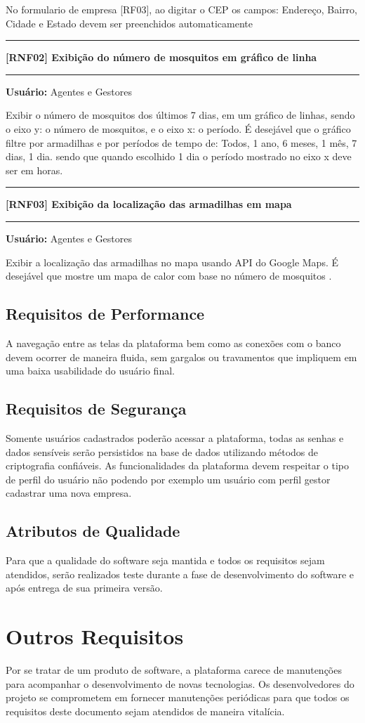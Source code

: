 	No formulario de empresa [RF03], ao digitar o CEP os campos: Endereço, Bairro, Cidade e Estado devem ser preenchidos automaticamente
	\begin{center}
		\noindent\rule{\textwidth}{0.4pt}
		\textbf{[RNF02] Exibição do número de mosquitos em gráfico de linha}
		\noindent\rule{\textwidth}{0.4pt}
	\end{center}
	\textbf{Usuário:} Agentes e Gestores
	
	Exibir o número de mosquitos dos últimos 7 dias, em um gráfico de linhas, sendo o eixo y: o número de mosquitos, e o eixo x: o período. 
	É desejável que o gráfico filtre por armadilhas e por períodos de tempo de: Todos, 1 ano, 6 meses, 1 mês, 7 dias, 1 dia. sendo que quando escolhido 
	1 dia o período mostrado no eixo x deve ser em horas.
	\begin{center}
		\noindent\rule{\textwidth}{0.4pt}
		\textbf{[RNF03] Exibição da localização das armadilhas em mapa}
		\noindent\rule{\textwidth}{0.4pt}
	\end{center}
	\textbf{Usuário:} Agentes e Gestores
	
	Exibir a localização das armadilhas no mapa usando API do Google Maps. É desejável que mostre um mapa de calor com base no número de mosquitos .
	
	\section*{Requisitos de Performance}
	A navegação entre as telas da plataforma bem como as conexões com o banco devem ocorrer de maneira fluida, sem gargalos ou travamentos que impliquem em uma baixa usabilidade 
	do usuário final.
	
	\section*{Requisitos de Segurança}
	Somente usuários cadastrados poderão acessar a plataforma, todas as senhas e dados sensíveis serão persistidos na base de dados utilizando métodos de criptografia confiáveis.
	As funcionalidades da plataforma devem respeitar o tipo de perfil do usuário não podendo por exemplo um usuário com perfil gestor cadastrar uma nova empresa.
	
	\section*{Atributos de Qualidade}
	Para que a qualidade do software seja mantida e todos os requisitos sejam atendidos, serão realizados teste durante a fase de desenvolvimento do software e após 
	entrega de sua primeira versão.
	
	\chapter*{Outros Requisitos}
	Por se tratar de um produto de software, a plataforma carece de manutenções para acompanhar o desenvolvimento de novas tecnologias. 
	Os desenvolvedores do projeto se comprometem em fornecer manutenções periódicas para que todos os requisitos deste documento sejam atendidos de maneira vitalícia.